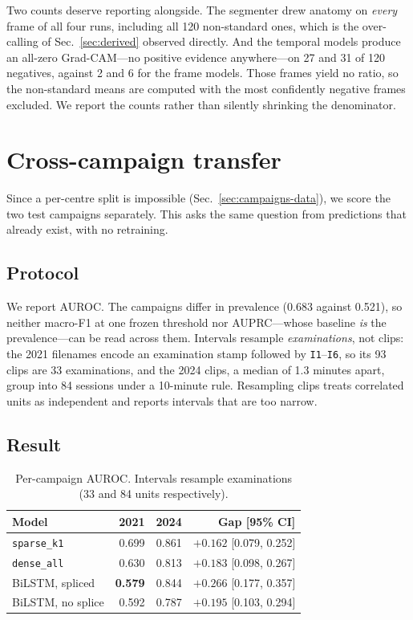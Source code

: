 \documentclass[conference]{IEEEtran}
\begin{document}
Two counts deserve reporting alongside. The segmenter drew anatomy on
\emph{every} frame of all four runs, including all 120 non-standard ones, which
is the over-calling of Sec.~\ref{sec:derived} observed directly. And the
temporal models produce an all-zero Grad-CAM---no positive evidence
anywhere---on 27 and 31 of 120 negatives, against 2 and 6 for the frame models.
Those frames yield no ratio, so the non-standard means are computed with the
most confidently negative frames excluded. We report the counts rather than
silently shrinking the denominator.

\section{Cross-campaign transfer}
\label{sec:campaign}

Since a per-centre split is impossible (Sec.~\ref{sec:campaigns-data}), we
score the two test campaigns separately. This asks the same question from
predictions that already exist, with no retraining.

\subsection{Protocol}

We report AUROC. The campaigns differ in prevalence (0.683 against 0.521), so
neither macro-F1 at one frozen threshold nor AUPRC---whose baseline \emph{is}
the prevalence---can be read across them. Intervals resample
\emph{examinations}, not clips: the 2021 filenames encode an examination stamp
followed by \texttt{I1}--\texttt{I6}, so its 93 clips are 33 examinations, and
the 2024 clips, a median of 1.3 minutes apart, group into 84 sessions under a
10-minute rule. Resampling clips treats correlated units as independent and
reports intervals that are too narrow.

\subsection{Result}

\begin{table}[t]
\caption{Per-campaign AUROC. Intervals resample examinations (33 and 84 units
respectively).}
\label{tab:campaign}
\centering
\small
\begin{tabular}{lrrr}
\toprule
Model & 2021 & 2024 & Gap [95\% CI] \\
\midrule
\texttt{sparse\_k1} & 0.699 & 0.861 & $+0.162$ [0.079, 0.252] \\
\texttt{dense\_all} & 0.630 & 0.813 & $+0.183$ [0.098, 0.267] \\
BiLSTM, spliced & \textbf{0.579} & 0.844 & $+0.266$ [0.177, 0.357] \\
BiLSTM, no splice & 0.592 & 0.787 & $+0.195$ [0.103, 0.294] \\
\bottomrule
\end{tabular}
\end{table}
\end{document}
